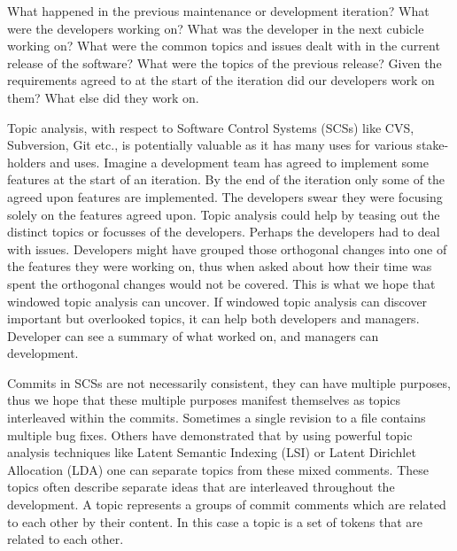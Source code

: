 \documentclass[times, 10pt,twocolumn]{article}
\begin{document}


What happened in the previous maintenance or development iteration? What were the developers
working on? What was the developer in the next cubicle working on?
What were the common topics and issues dealt with in the current
release of the software? What were the topics of the previous release?
Given the requirements agreed to at the start of the iteration did our
developers work on them? What else did they work on. 

Topic analysis, with respect to Software Control Systems (SCSs) like
CVS, Subversion, Git etc., is potentially valuable as it has many uses
for various stake-holders and uses.
Imagine a
development team has agreed to implement some features at the start of
an iteration. By the end of the iteration only some of the agreed upon
features are implemented. The developers swear they were focusing
solely on the features agreed upon. Topic analysis could help by
teasing out the distinct topics or focusses of the developers. Perhaps
the developers had to deal with issues.
Developers might have grouped those orthogonal changes into
one of the features they were working on, thus when asked about how
their time was spent the orthogonal changes would not be covered. This
is what we hope that windowed topic analysis can uncover. If windowed
topic analysis can discover important but overlooked topics, it can
help both developers and managers. Developer can see a
summary of what worked on, and managers can development.


Commits in SCSs are not necessarily consistent, they can have multiple
purposes, thus we hope that these multiple purposes manifest themselves as
topics interleaved within the commits.  Sometimes a single revision to
a file contains multiple bug fixes.  Others have demonstrated that by
using powerful topic analysis techniques like Latent Semantic Indexing
(LSI) or Latent Dirichlet Allocation (LDA) one can separate topics
from these mixed comments. These topics often describe separate ideas
that are interleaved throughout the development. A topic represents a
groups of commit comments which are related to each other by their
content.  In this case a topic is a set of tokens that are related to
each other.

\end{document}
